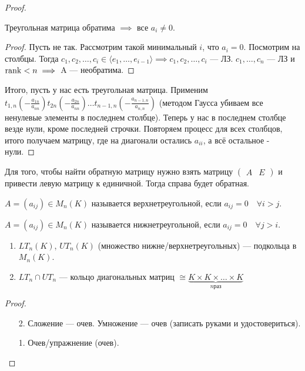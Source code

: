 \begin{proof}
    \begin{statement}
        Треугольная матрица обратима $\implies$ все  $a_i \neq 0$.
    \end{statement}
    \begin{proof}
        Пусть не так. Рассмотрим такой минимальный $i$, что  $a_i = 0$. Посмотрим на столбцы. Тогда  $c_1, c_2, \ldots, c_i \in \langle e_1, \ldots, e_{i-1} \rangle \implies c_1, c_2, \ldots, c_i$ --- ЛЗ. $c_1,\ldots,c_n$ --- ЛЗ и $\operatorname{rank} < n \implies$ A --- необратима.
    \end{proof}
    Итого, пусть у нас есть треугольная матрица. Применим $t_{1, n}(-\frac{a_{1n}}{a_{nn}})t_{2n}(-\frac{a_{2n}}{a_{nn}})\ldots t_{n-1,n}(-\frac{a_{n-1,n}}{a_{n,n}})$ (методом Гаусса убиваем все ненулевые элементы в последнем столбце). Теперь у нас в последнем столбце везде нули, кроме последней строчки. Повторяем процесс для всех столбцов, итого получаем матрицу, где на диагонали остались $a_{ii}$, а всё остальное - нули.
\end{proof}
\begin{statement}
    Для того, чтобы найти обратную матрицу нужно взять матрицу $\left(\begin{array}{c|c} A & E \end{array}\right)$ и привести левую матрицу к единичной. Тогда справа будет обратная.
\end{statement}
\begin{definition}
    $A = (a_{ij}) \in M_n(K)$ называется верхнетреугольной, если  $a_{ij} = 0 \quad \forall i > j$.

     $A = (a_{ij}) \in M_n(K)$ называется нижнетреугольной, если  $a_{ij} = 0 \quad \forall j > i$.
\end{definition}
\begin{statement}
    \begin{enumerate}
        \item $LT_n(K)$,  $UT_n(K)$ (множество нижне/верхнетреугольных) --- подкольца в  $M_n(K)$.
        \item $LT_n \cap UT_n$ --- кольцо диагональных матриц  $\cong \underbrace{K \times K \times \ldots \times K}_{n \text{раз}}$
    \end{enumerate}
\end{statement}
\begin{proof}
    \slashn
    \begin{enumerate}
        \item[2.] Сложение --- очев. Умножение --- очев (записать руками и удостовериться).
        \item [1.] Очев/упражнение (очев).
    \end{enumerate}
\end{proof}
